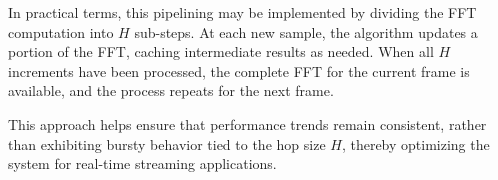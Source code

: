 \documentclass[12pt,letter]{article}
\begin{document}
In practical terms, this pipelining may be implemented by dividing the FFT
computation into $H$ sub-steps. At each new sample, the algorithm updates
a portion of the FFT, caching intermediate results as needed. When all
$H$ increments have been processed, the complete FFT for the current
frame is available, and the process repeats for the next frame.

This approach helps ensure that performance trends remain consistent, rather
than exhibiting bursty behavior tied to the hop size $H$, thereby
optimizing the system for real-time streaming applications.


\clearpage
\renewcommand\refname{References}




\clearpage
\finalPage
\end{document}
